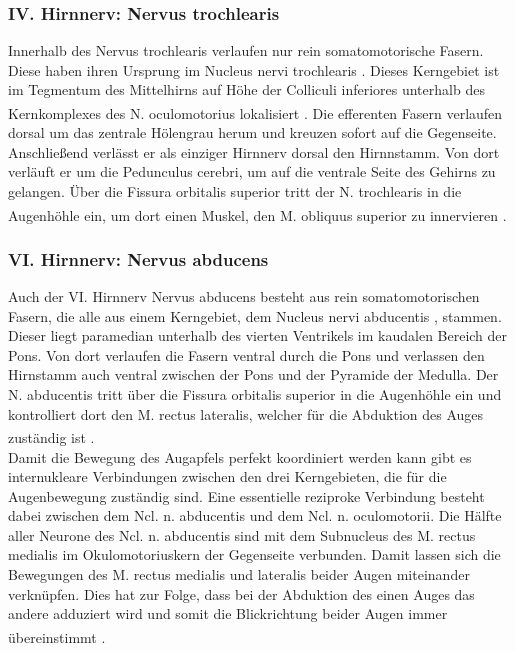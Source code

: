 \documentclass[12pt,a4paper,pdftex]{article}
\begin{document}
\subsubsection*{IV. Hirnnerv: Nervus trochlearis} 
Innerhalb des Nervus trochlearis verlaufen nur rein somatomotorische Fasern. Diese haben ihren Ursprung im Nucleus nervi trochlearis . Dieses Kerngebiet ist im Tegmentum des Mittelhirns auf Höhe der Colliculi inferiores unterhalb des Kernkomplexes des N. oculomotorius lokalisiert \textsuperscript{\cite[5]{trepel2011neuroanatomie}}. Die efferenten Fasern verlaufen dorsal um das zentrale Hölengrau herum und kreuzen sofort auf die Gegenseite. Anschließend verlässt er als einziger Hirnnerv dorsal den Hirnnstamm. Von dort verläuft er um die Pedunculus cerebri, um auf die ventrale Seite des Gehirns zu gelangen. Über die Fissura orbitalis superior tritt der N. trochlearis in die Augenhöhle ein, um dort einen Muskel, den M. obliquus superior zu innervieren \textsuperscript{\cite[10]{crossman2014neuroanatomy}}.   

\subsubsection*{VI. Hirnnerv: Nervus abducens} 
Auch der VI. Hirnnerv Nervus abducens besteht aus rein somatomotorischen Fasern, die alle aus einem Kerngebiet, dem Nucleus nervi abducentis , stammen. Dieser liegt paramedian unterhalb des vierten Ventrikels im kaudalen Bereich der Pons. Von dort verlaufen die Fasern ventral durch die Pons und verlassen den Hirnstamm auch ventral zwischen der Pons und der Pyramide der Medulla. Der N. abducentis tritt über die Fissura orbitalis superior in die Augenhöhle ein und kontrolliert dort den M. rectus lateralis, welcher für die Abduktion des Auges zuständig ist \textsuperscript{\cite[10]{crossman2014neuroanatomy}}. \\    
Damit die Bewegung des Augapfels perfekt koordiniert werden kann gibt es internukleare Verbindungen zwischen den drei Kerngebieten, die für die Augenbewegung zuständig sind.    
Eine essentielle reziproke Verbindung besteht dabei zwischen dem Ncl. n. abducentis und dem Ncl. n. oculomotorii. Die Hälfte aller Neurone des Ncl. n. abducentis sind mit dem Subnucleus des M. rectus medialis im Okulomotoriuskern der Gegenseite verbunden. Damit lassen sich die Bewegungen des M. rectus medialis und lateralis beider Augen miteinander verknüpfen. Dies hat zur Folge, dass bei der Abduktion des einen Auges das andere adduziert wird und somit die Blickrichtung beider Augen immer übereinstimmt \textsuperscript{\cite[6]{trepel2011neuroanatomie}}. 
\end{document}
